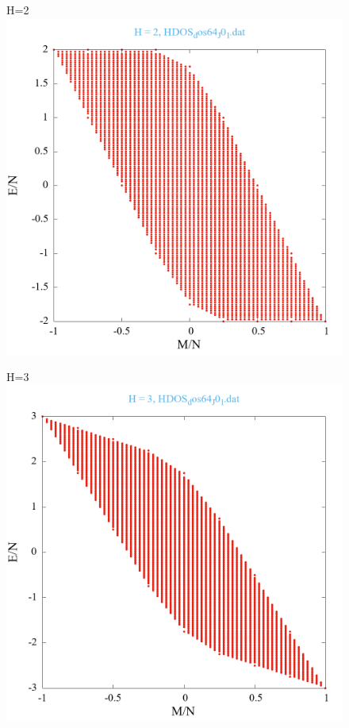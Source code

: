 \documentclass[utf8, babel, sor, jor, amsmath, amssymb, reprint]{elsarticle} %
\begin{document}
\begin{figure}[H]
\begin{minipage}[h]{0.45\linewidth}
	\end{minipage}
	\vfill
	\begin{minipage}[h]{0.45\linewidth}
		\centering H=2
		\includegraphics[width=1\linewidth]{HDOS_dos64_J0_1.dat_H2.png}
	\end{minipage}
	\hfill
	\begin{minipage}[h]{0.45\linewidth}
		\centering H=3
		\includegraphics[width=1\linewidth]{HDOS_dos64_J0_1.dat_H3.png}

\end{minipage}
\end{figure}
\end{document}
